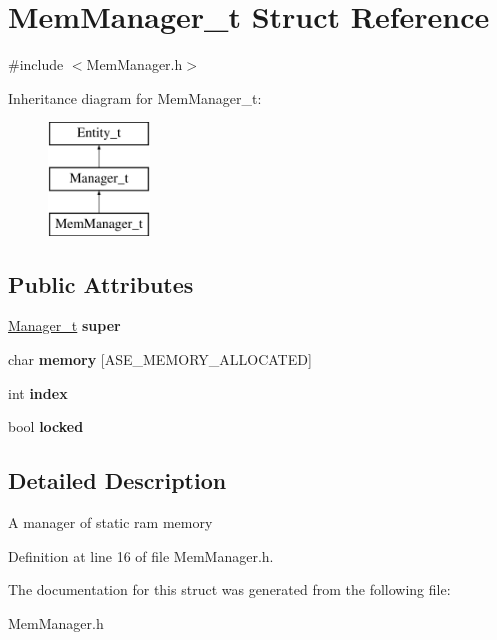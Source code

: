 \hypertarget{structMemManager__t}{
\section{MemManager\_\-t Struct Reference}
\label{structMemManager__t}
}


{\ttfamily \#include $<$MemManager.h$>$}

Inheritance diagram for MemManager\_\-t:\begin{figure}[H]
\begin{center}
\leavevmode
\includegraphics[height=3.000000cm]{structMemManager__t}
\end{center}
\end{figure}
\subsection*{Public Attributes}
\begin{DoxyCompactItemize}
\item 
\hypertarget{structMemManager__t_acd7201404c60d6c521c1dae41cd055b9}{
\hyperlink{structManager__t}{Manager\_\-t} {\bfseries super}}
\label{structMemManager__t_acd7201404c60d6c521c1dae41cd055b9}

\item 
\hypertarget{structMemManager__t_a9f99bc61810e4ba0e821fd0b8521070f}{
char {\bfseries memory} \mbox{[}ASE\_\-MEMORY\_\-ALLOCATED\mbox{]}}
\label{structMemManager__t_a9f99bc61810e4ba0e821fd0b8521070f}

\item 
\hypertarget{structMemManager__t_a68a94f719c63e57f64d790ae5442383d}{
int {\bfseries index}}
\label{structMemManager__t_a68a94f719c63e57f64d790ae5442383d}

\item 
\hypertarget{structMemManager__t_a905a73da0b4cbadab5e3a6e8755698fc}{
bool {\bfseries locked}}
\label{structMemManager__t_a905a73da0b4cbadab5e3a6e8755698fc}

\end{DoxyCompactItemize}


\subsection{Detailed Description}
A manager of static ram memory 

Definition at line 16 of file MemManager.h.



The documentation for this struct was generated from the following file:\begin{DoxyCompactItemize}
\item 
MemManager.h\end{DoxyCompactItemize}
